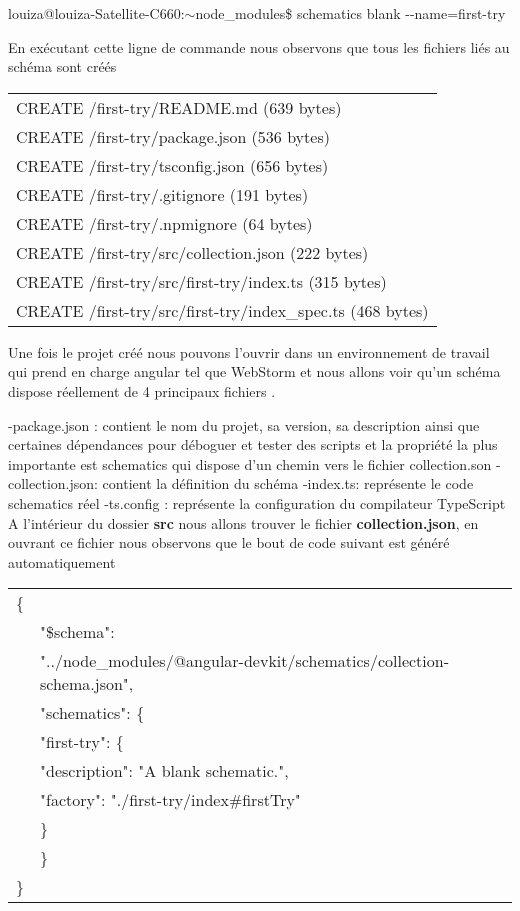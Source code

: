 \documentclass[12pt,french]{article}
\begin{document}
	\qquad louiza@louiza-Satellite-C660:$\sim$node\_modules\$ schematics blank \--\--name=first-try\newline
	
	En exécutant cette ligne de commande nous observons que tous les fichiers liés au schéma sont créés\newline
	
	\begin{tabular}{l}
		\qquad CREATE /first-try/README.md (639 bytes)\\
		\qquad CREATE /first-try/package.json (536 bytes)\\
		\qquad CREATE /first-try/tsconfig.json (656 bytes)\\
		\qquad CREATE /first-try/.gitignore (191 bytes)\\
		\qquad CREATE /first-try/.npmignore (64 bytes)\\
		\qquad CREATE /first-try/src/collection.json (222 bytes)\\
		\qquad CREATE /first-try/src/first-try/index.ts (315 bytes)\\
		\qquad CREATE /first-try/src/first-try/index\_spec.ts (468 bytes)
	\end{tabular}\break

	 Une fois le projet créé nous pouvons l’ouvrir dans un environnement de travail qui prend en charge angular tel que WebStorm et nous allons voir qu’un schéma dispose réellement de 4 principaux fichiers .\newline

	-package.json : contient le nom du projet, sa version, sa description ainsi que certaines dépendances pour déboguer et tester des scripts et la propriété la plus importante est schematics qui dispose d’un chemin vers le fichier collection.son\smallbreak
	-collection.json: contient la définition du schéma\smallbreak
	-index.ts: représente le code schematics réel\smallbreak
	-ts.config : représente la configuration du compilateur TypeScript\newline	
	A l'intérieur du dossier \textbf{src} nous allons trouver le fichier \textbf{collection.json}, en ouvrant ce fichier nous observons que le bout de code suivant est généré automatiquement\newline
	
	\begin{tabular}{ll}
		\{&\\
		&"\$schema":\\ &"../node\_modules/@angular-devkit/schematics/collection-schema.json",\\
		&"schematics": \{\\
		&\quad"first-try": \{
\\
		&\qquad"description": "A blank schematic.",
\\
		&\qquad"factory": "./first-try/index\#firstTry"\\
		&\quad \}
\\
		& \}
\\
		\}
	\end{tabular}\break
\end{document}

